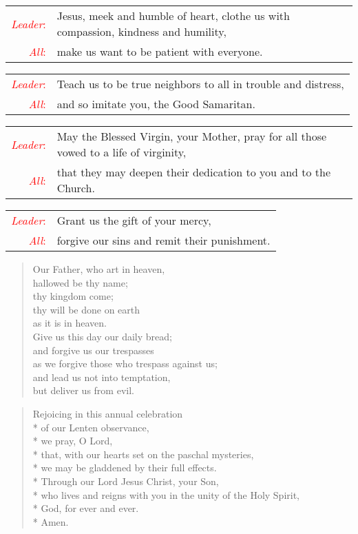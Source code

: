 \documentclass[letterpaper,14pt]{extarticle}
\newcommand{\side}[1]{\flagverse{\textcolor{red}{\textit{#1}:}}}
\newcommand{\sidestar}[1]{\textcolor{red}{\textit{#1}:}}
\newlength{\oldindent}
\newcommand{\antiphon}[2]{
	\setlength{\oldindent}{\vindent}
	\setlength{\vindent}{0em}
	\begin{verse}
	\side{#1} \textbf{#2}
	\end{verse}
	\setlength{\vindent}{\oldindent}
}
\newcommand{\intercession}[2]{
	\begin{tabular}[h]{r p{4.25in}}
		\sidestar{Leader} & #1 \\
		\sidestar{All} & #2
	\end{tabular}}
\begin{document}
\intercession{Jesus, meek and humble of heart, clothe us with compassion, kindness and humility,}
{make us want to be patient with everyone.}

\intercession{Teach us to be true neighbors to all in trouble and distress,}
{and so imitate you, the Good Samaritan.}

\intercession{May the Blessed Virgin, your Mother, pray for all those vowed to a life of virginity,}
{that they may deepen their dedication to you and to the Church.}

\intercession{Grant us the gift of your mercy,}
{forgive our sins and remit their punishment.}

	
\begin{verse}
	\side{All} Our Father, who art in heaven,\\ %
hallowed be thy name; \\
thy kingdom come; \\
thy will be done on earth \\
as it is in heaven. \\
Give us this day our daily bread; \\
and forgive us our trespasses \\
as we forgive those who trespass against us; \\
and lead us not into temptation, \\
but deliver us from evil.
\end{verse}


\begin{verse}
\side{Pastor} Rejoicing in this annual celebration \\*
of our Lenten observance, \\*
we pray, O Lord, \\*
that, with our hearts set on the paschal mysteries, \\*
we may be gladdened by their full effects. \\*
Through our Lord Jesus Christ, your Son,\\*
who lives and reigns with you in the unity of the Holy Spirit,\\*
God, for ever and ever.\\*
\side{All} Amen.
\end{verse}
\end{document}
